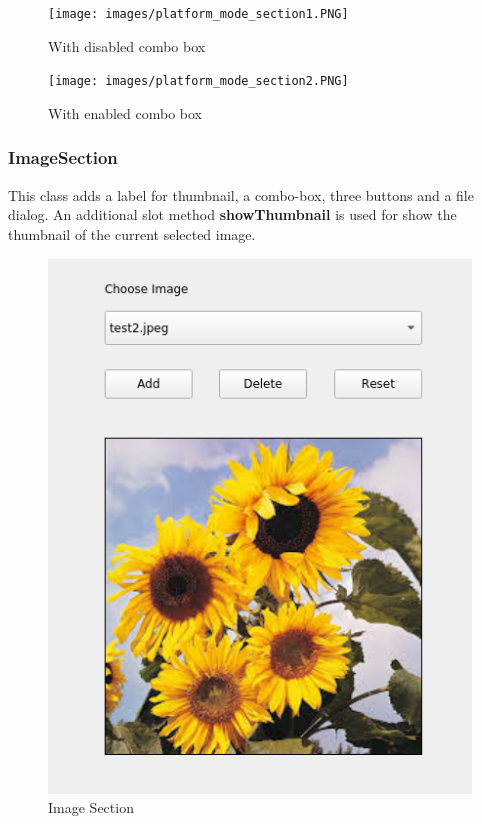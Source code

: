\documentclass[parskip=full]{scrartcl}
\newcommand\tab[1][1cm]{\hspace*{#1}}
\begin{document}
        \begin{figure}[H]
	        \centering
	        \texttt{[image: images/platform\_mode\_section1.PNG]}
	        \caption{With disabled combo box}
	        \label{fig:my_label}
	    \end{figure}
	    
	   \begin{figure}[H]
	        \centering
	        \texttt{[image: images/platform\_mode\_section2.PNG]}
	        \caption{With enabled combo box}
	        \label{fig:my_label}
	    \end{figure}
        
        \subsubsection{ImageSection}
        \label{sec: ImageSection}
        \tab This class adds a label for thumbnail, a combo-box, three buttons and a file dialog. An additional slot method \textbf{showThumbnail} is used for show the thumbnail of the current selected image. 
        
        \begin{figure}[H]
	        \centering
	        \includegraphics{images/imagesection1.PNG}
	        \caption{Image Section}
	        \label{fig:my_label}
	    \end{figure}
	    
\end{document}
